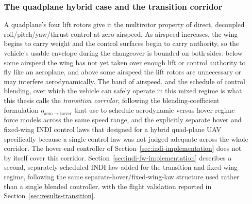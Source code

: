 \documentclass{article}
\begin{document}
\subsubsection{The quadplane hybrid case and the transition corridor}
\label{sec:transition-corridor}
A quadplane's four lift rotors give it the multirotor property of direct, decoupled roll/pitch/yaw/thrust control at zero airspeed. As airspeed increases, the wing begins to carry weight and the control surfaces begin to carry authority, so the vehicle's usable envelope during the changeover is bounded on both sides: below some airspeed the wing has not yet taken over enough lift or control authority to fly like an aeroplane, and above some airspeed the lift rotors are unnecessary or may interfere aerodynamically. The band of airspeed, and the schedule of control blending, over which the vehicle can safely operate in this mixed regime is what this thesis calls the \emph{transition corridor}, following the blending-coefficient formulation $\eta_{\mathrm{aero}\to\mathrm{hover}}$ that \citet{lombaerts2019} use to schedule aerodynamic versus hover-regime force models across the same speed range, and the explicitly separate hover and fixed-wing INDI control laws that \citet{zhou2023} designed for a hybrid quad-plane UAV specifically because a single control law was not judged adequate across the whole corridor. The hover-end controller of Section~\ref{sec:indi-implementation} does not by itself cover this corridor. Section~\ref{sec:indi-fw-implementation} describes a second, separately-scheduled INDI law added for the transition and fixed-wing regime, following the same separate-hover/fixed-wing-law structure \citet{zhou2023} used rather than a single blended controller, with the flight validation reported in Section~\ref{sec:results-transition}.
\end{document}

